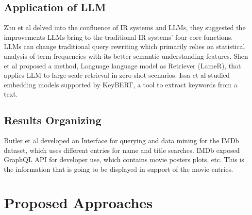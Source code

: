 \documentclass[journal]{IEEEtran}
\begin{document}
\subsection{Application of LLM}
Zhu et al\cite{LLM4IRSurvey} delved into the confluence of IR systems and LLMs, they suggested the improvements LLMs bring to the traditional IR systems’ four core functions. LLMs can change traditional query rewriting which primarily relies on statistical analysis of term frequencies with its better semantic understanding features. Shen et al\cite{RN11} proposed a method, Language language model as Retriever (LameR), that applies LLM to large-scale retrieval in zero-shot scenarios. Issa et al\cite{10295108} studied embedding models supported by KeyBERT, a tool to extract keywords from a text.

\subsection{Results Organizing}
Butler et al\cite{7494103} developed an Interface for querying and data mining for the IMDb dataset, which uses different entries for name and title searches. IMDb\cite{IMDb} exposed GraphQL API for developer use, which contains movie posters plots, etc. This is the information that is going to be displayed in support of the movie entries.

\section{Proposed Approaches}
\end{document}
